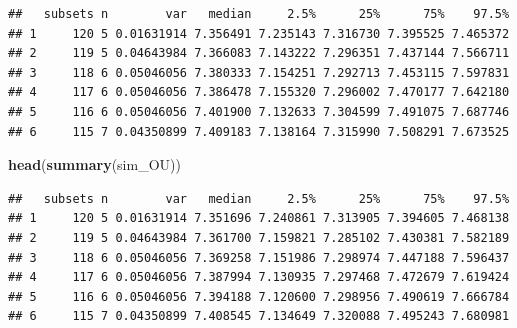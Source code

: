 \documentclass[]{book}
\newenvironment{Shaded}{\begin{snugshade}}{\end{snugshade}}
\newcommand{\CommentTok}[1]{\textcolor[rgb]{0.56,0.35,0.01}{\textit{#1}}}
\newcommand{\DataTypeTok}[1]{\textcolor[rgb]{0.13,0.29,0.53}{#1}}
\newcommand{\KeywordTok}[1]{\textcolor[rgb]{0.13,0.29,0.53}{\textbf{#1}}}
\newcommand{\NormalTok}[1]{#1}
\newcommand{\OtherTok}[1]{\textcolor[rgb]{0.56,0.35,0.01}{#1}}
\newcommand{\StringTok}[1]{\textcolor[rgb]{0.31,0.60,0.02}{#1}}
\begin{document}
\begin{verbatim}
##   subsets n        var   median     2.5%      25%      75%    97.5%
## 1     120 5 0.01631914 7.356491 7.235143 7.316730 7.395525 7.465372
## 2     119 5 0.04643984 7.366083 7.143222 7.296351 7.437144 7.566711
## 3     118 6 0.05046056 7.380333 7.154251 7.292713 7.453115 7.597831
## 4     117 6 0.05046056 7.386478 7.155320 7.296002 7.470177 7.642180
## 5     116 6 0.05046056 7.401900 7.132633 7.304599 7.491075 7.687746
## 6     115 7 0.04350899 7.409183 7.138164 7.315990 7.508291 7.673525
\end{verbatim}

\begin{Shaded}
\begin{Highlighting}[]
\KeywordTok{head}\NormalTok{(}\KeywordTok{summary}\NormalTok{(sim_OU))}
\end{Highlighting}
\end{Shaded}

\begin{verbatim}
##   subsets n        var   median     2.5%      25%      75%    97.5%
## 1     120 5 0.01631914 7.351696 7.240861 7.313905 7.394605 7.468138
## 2     119 5 0.04643984 7.361700 7.159821 7.285102 7.430381 7.582189
## 3     118 6 0.05046056 7.369258 7.151986 7.298974 7.447188 7.596437
## 4     117 6 0.05046056 7.387994 7.130935 7.297468 7.472679 7.619424
## 5     116 6 0.05046056 7.394188 7.120600 7.298956 7.490619 7.666784
## 6     115 7 0.04350899 7.408545 7.134649 7.320088 7.495243 7.680981
\end{verbatim}

\begin{Shaded}
\end{Shaded}
\end{document}

